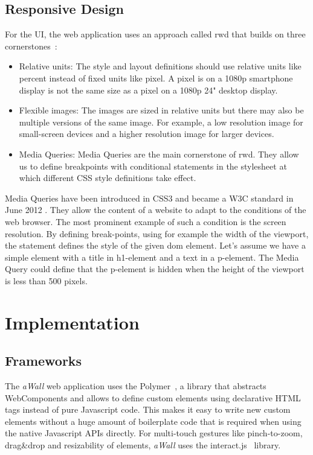 \documentclass{sigchi}
\begin{document}
\subsection{Responsive Design}
For the UI, the web application uses an approach called \gls{rwd} that builds on three cornerstones~\cite{Marcotte:2011}:
\begin{itemize}
	\item Relative units: The style and layout definitions should use relative units like percent instead of fixed units like pixel. A pixel is on a 1080p smartphone display is not the same size as a pixel on a 1080p 24" desktop display. 
	\item Flexible images: The images are sized in relative units but there may also be multiple versions of the same image. For example, a low resolution image for small-screen devices and a higher resolution image for larger devices.
	\item Media Queries: Media Queries are the main cornerstone of \gls{rwd}. They allow us to define breakpoints with conditional statements in the stylesheet at which different CSS style definitions take effect.
\end{itemize}

Media Queries have been introduced in CSS3 and became a W3C standard in June 2012 \cite{mediaqueriesW3C}.
They allow the content of a website to adapt to the conditions of the web browser.
The most prominent example of such a condition is the screen resolution.
By defining break-points, using for example the width of the viewport, the statement defines the style of the given \gls{dom} element.
Let's assume we have a simple element with a title in h1-element and a text in a p-element.
The Media Query could define that the p-element is hidden when the height of the viewport is less than 500 pixels.


\section{Implementation}
\subsection{Frameworks}
The \textit{aWall} web application uses the Polymer~\cite{polymer}, a library that abstracts WebComponents and allows to define custom elements using declarative HTML tags instead of pure Javascript code.
This makes it easy to write new custom elements without a huge amount of boilerplate code that is required when using the native Javascript APIs directly.
For multi-touch gestures like pinch-to-zoom, drag\&drop and resizability of elements, \textit{aWall} uses the interact.js~\cite{interactJs} library.
\end{document}
